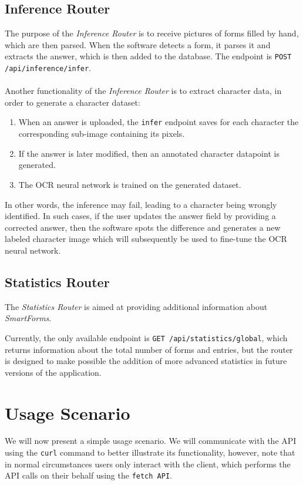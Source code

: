 \documentclass[11pt, a4paper]{report}
\def\code#1{\texttt{#1}}
\begin{document}
\subsection{Inference Router}

The purpose of the \textit{Inference Router} is to receive pictures of forms filled by hand, which are then parsed.
When the software detects a form, it parses it and extracts the answer, which is then added to the database. The endpoint is \code{POST /api/inference/infer}.
\\ \\
Another functionality of the \textit{Inference Router} is to extract character data, in order to generate a character dataset:
\begin{enumerate}
    \item When an answer is uploaded, the \code{infer} endpoint saves for each character the corresponding sub-image containing its pixels.
    \item If the answer is later modified, then an annotated character datapoint is generated.
    \item The OCR neural network is trained on the generated dataset.
\end{enumerate}

In other words, the inference may fail, leading to a character being wrongly identified. In such cases, if the user updates the answer field by providing a corrected answer, then the software spots the difference and  generates a new labeled character image which will subsequently be used to fine-tune the OCR neural network.

\subsection{Statistics Router}

The \textit{Statistics Router} is aimed at providing additional information about \textit{SmartForms}.

Currently, the only available endpoint is \code{GET /api/statistics/global}, which returns information about the total number of forms and entries, but the router is designed to make possible the addition of more advanced statistics in future versions of the application.

\section{Usage Scenario}

We will now present a simple usage scenario. We will communicate with the API using the \code{curl} command to better illustrate its functionality, however, note that in normal circumstances users only interact with the client, which performs the API calls on their behalf using the \code{fetch API}.
\end{document}
